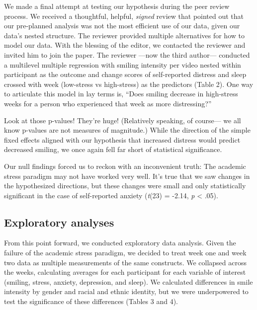 \documentclass[authordate, empirical,issue]{jote-new-article}
\begin{document}
We made a final attempt at testing our hypothesis during the peer review process. We received a thoughtful, helpful, \emph{signed }review that pointed out that our pre-planned analysis was not the most efficient use of our data, given our data's nested structure. The reviewer provided multiple alternatives for how to model our data. With the blessing of the editor, we contacted the reviewer and invited him to join the paper. The reviewer —now the third author— conducted a multilevel multiple regression with smiling intensity per video nested within participant as the outcome and change scores of self-reported distress and sleep crossed with week (low-stress vs high-stress) as the predictors (Table 2). One way to articulate this model in lay terms is, ``Does smiling decrease in high-stress weeks for a person who experienced that week as more distressing?”













Look at those p-values! They're huge! (Relatively speaking, of course— we all know p-values are not measures of magnitude.) While the direction of the simple fixed effects aligned with our hypothesis that increased distress would predict decreased smiling, we once again fell far short of statistical significance.



Our null findings forced us to reckon with an inconvenient truth: The academic stress paradigm may not have worked very well. It's true that we saw changes in the hypothesized directions, but these changes were small and only statistically significant in the case of self-reported anxiety (\emph{t}(23) = -2.14, \emph{p} < .05).








\subsection{Exploratory analyses}



From this point forward, we conducted exploratory data analysis. Given the failure of the academic stress paradigm, we decided to treat week one and week two data as multiple measurements of the same constructs. We collapsed across the weeks, calculating averages for each participant for each variable of interest (smiling, stress, anxiety, depression, and sleep). We calculated differences in smile intensity by gender and racial and ethnic identity, but we were underpowered to test the significance of these differences (Tables 3 and 4).
\end{document}
